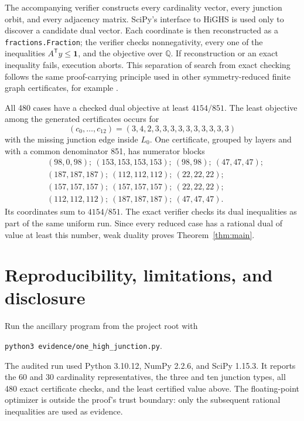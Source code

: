 \documentclass[11pt]{article}
\theoremstyle{remark}
\newcommand{\one}{\mathbf 1}
\begin{document}
The accompanying verifier constructs every cardinality vector, every
junction orbit, and every adjacency matrix.  SciPy's interface to HiGHS
\cite{VirtanenEtAl2020,HuangfuHall2018} is used only to discover a candidate
dual vector.  Each coordinate is then reconstructed as a
\texttt{fractions.Fraction}; the verifier checks nonnegativity, every one of
the inequalities $A^{\mathsf T}y\leq\one$, and the objective over
$\mathbb Q$.  If reconstruction or an exact inequality fails, execution
aborts.  This separation of search from exact checking follows the same
proof-carrying principle used in other symmetry-reduced finite graph
certificates, for example \cite{202608.1658}.

All 480 cases have a checked dual objective at least $4154/851$.  The least
objective among the generated certificates occurs for
\[
 (c_0,\ldots,c_{12})=(3,4,2,3,3,3,3,3,3,3,3,3,3)
\]
with the missing junction edge inside $L_0$.  One certificate, grouped by
layers and with a common denominator 851, has numerator blocks
\begin{align*}
 &(98,0,98);\ (153,153,153,153);\ (98,98);\ (47,47,47);\\
 &(187,187,187);\ (112,112,112);\ (22,22,22);\\
 &(157,157,157);\ (157,157,157);\ (22,22,22);\\
 &(112,112,112);\ (187,187,187);\ (47,47,47).
\end{align*}
Its coordinates sum to $4154/851$.  The exact verifier checks its dual
inequalities as part of the same uniform run.  Since every reduced case has a
rational dual of value at least this number, weak duality proves
Theorem~\ref{thm:main}.

\section{Reproducibility, limitations, and disclosure}

Run the ancillary program from the project root with
\begin{center}
\texttt{python3 evidence/one\_high\_junction.py}.
\end{center}
The audited run used Python 3.10.12, NumPy 2.2.6, and SciPy 1.15.3.  It
reports the 60 and 30 cardinality representatives, the three and ten junction
types, all 480 exact certificate checks, and the least certified value above.
The floating-point optimizer is outside the proof's trust boundary: only the
subsequent rational inequalities are used as evidence.
\end{document}
